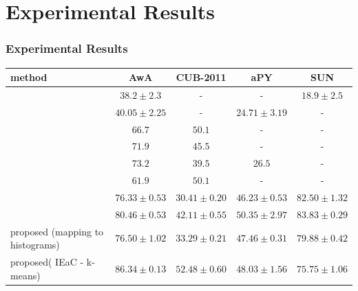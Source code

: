 \documentclass{beamer}
\begin{document}
\section{Experimental Results}
\label{sec:Experimental Results}

\begin{frame}\frametitle{Experimental Results}
  \begin{center}
  {\scriptsize
  \begin{tabular}{|l|c|c|c|c|}
  \hline
  method  & AwA & CUB-2011 & aPY & SUN \\
  \hline

    {\tiny \cite{li15max}}                 &  $38.2 \pm 2.3$   &    -             &  -                       & $18.9 \pm 2.5$ \\
   {\tiny \cite{semi15}}                    &  $40.05\pm 2.25$ &       -          &   $24.71 \pm 3.19$       & -    \\
  \hline
   {\tiny \cite{Akata2015}}              & $66.7$          & $50.1$            &         -                & -\\
   {\tiny \cite{Xian2016}}                & $71.9$            & $45.5$            &        -                 & -\\
  \hline
  {\tiny \cite{Kodirov2015}}
                                              & $73.2$            &  $39.5$           & $26.5$                    &  -\\
   {\tiny \cite{Akata2015}}              & $61.9$            &  $50.1$           &                 -        & -\\
    {\tiny \cite{sse}}            &  $76.33 \pm 0.53$ & $30.41 \pm 0.20$ &   $46.23 \pm 0.53$      & $82.50 \pm 1.32$    \\
   {\tiny \cite{agnostic} }      &  $80.46 \pm 0.53$ & $42.11 \pm 0.55$ &   \textbf{$\mathbf{50.35 \pm 2.97}$}      & \underline{$83.83 \pm 0.29$}    \\
    {\tiny proposed (mapping to histograms)}
                          & $76.50 \pm 1.02$               & $33.29 \pm 0.21$              & $47.46 \pm 0.31$              & $79.88 \pm 0.42$ \\
   {\tiny proposed( IEaC -  {k-means})}
                            & $86.34 \pm 0.13$               & $52.48 \pm 0.60$              & $48.03 \pm 1.56$              & $75.75 \pm 1.06$ \\

\end{tabular}}
\end{center}
\end{frame}
\end{document}

